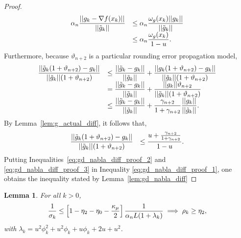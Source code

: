 \documentclass{article}[12pt]
\newtheorem{lemma}[]{Lemma}
\begin{document}
\begin{proof}
\begin{equation}
    		\begin{array}{ll}
    			\alpha_n\dfrac{||g_k - \nabla f(x_k)||}{||\tilde{g}_k||} & \leq \alpha_n\dfrac{\omega_g(x_k)||g_k||}{||\tilde{g}_k||}\\
    			& \leq \alpha_n\dfrac{\omega_g(x_k)}{1-u}.
    		\end{array}
    	\end{equation}
    	Furthermore, because $\vartheta_{n+2}$ is a particular rounding error propagation model,
    	\begin{equation}
    		\begin{array}{ll}
    			\dfrac{||\tilde{g}_k(1+\vartheta_{n+2}) - g_k||}{||\tilde{g}_k||(1+\vartheta_{n+2})}
    			& \leq \dfrac{||\tilde{g}_k - g_k||}{||\tilde{g}_k||} + \dfrac{||g_k(1+\vartheta_{n+2}) - g_k||}{||\tilde{g}_k||(1+\vartheta_{n+2})} \\
    			& = \dfrac{||\tilde{g}_k - g_k||}{||\tilde{g}_k||} + \dfrac{||g_k||\vartheta_{n+2}}{||\tilde{g}_k||(1+\vartheta_{n+2})} \\
    			& \leq \dfrac{||\tilde{g}_k - g_k||}{||\tilde{g}_k||} + \dfrac{\gamma_{n+2}}{1+\gamma_{n+2}}\dfrac{||g_k||}{||\tilde{g}_k||}. \\
    		\end{array}
    	\end{equation}
    	By Lemma~\ref{lem:g_actual_diff}, it follows that,
    	\begin{equation}
    		\label{eq:gd_nabla_diff_proof_3}
    		\begin{array}{ll}
    			\dfrac{||\tilde{g}_k(1+\vartheta_{n+2}) - g_k||}{||\tilde{g}_k||(1+\vartheta_{n+2})} & \leq  \dfrac{u+\frac{\gamma_{n+2}}{1+\gamma_{n+2}}}{1-u}.
    		\end{array}
    	\end{equation}
    	Putting Inequalities~\eqref{eq:gd_nabla_diff_proof_2} and \eqref{eq:gd_nabla_diff_proof_3} in Inequality \eqref{eq:gd_nabla_diff_proof_1}, one obtains the inequality stated by Lemma~\ref{lem:gd_nabla_diff}
    \end{proof}
    
    \begin{lemma}
    	\label{lem:sigma-very-successful-inexact-sum}
    	For all $k>0$,
    	\begin{equation}
    		\dfrac{1}{\sigma_k} \leq \left[1-\eta_2 - \eta_0 - \dfrac{\kappa_\mu}{2}\right]\dfrac{1}{\alpha_nL(1+\lambda_k)} \implies \rho_k\geq \eta_2,
    	\end{equation} 
    	with $\lambda_k = u^2\phi_k^2+u^2\phi_k + u\phi_k +2u+u^2$.
    \end{lemma}
    
\end{document}
